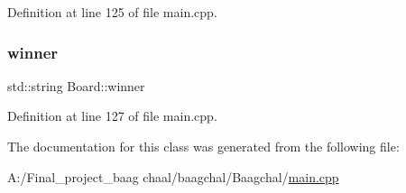 Definition at line 125 of file main.\+cpp.

\mbox{\label{class_board_a6c7f6acc261614facb3768ca8712d9ba}} 
\subsubsection{\texorpdfstring{winner}{winner}}
{\footnotesize\ttfamily std\+::string Board\+::winner}



Definition at line 127 of file main.\+cpp.



The documentation for this class was generated from the following file\+:\begin{DoxyCompactItemize}
\item 
A\+:/\+Final\+\_\+project\+\_\+baag chaal/baagchal/\+Baagchal/\mbox{\hyperlink{main_8cpp}{main.\+cpp}}\end{DoxyCompactItemize}
